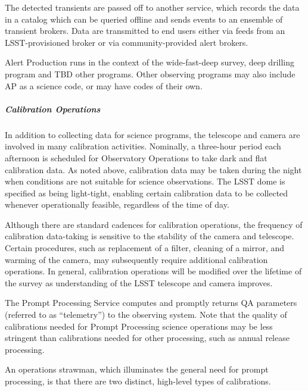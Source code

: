 The detected transients are passed off to another service, which
records the data in a catalog which can be queried offline and sends
events to an ensemble of transient brokers. Data are transmitted to end
users either via feeds from an LSST-provisioned broker or via
community-provided alert brokers.

Alert Production runs in the context of the wide-fast-deep survey,
deep drilling program and TBD other programs. Other observing programs
may also include AP as a science code, or may have codes of their own.

\subparagraph{Calibration Operations}

In addition to collecting data for science programs, the telescope and
camera are involved in many calibration activities. Nominally, a 
three-hour period each afternoon is scheduled for Observatory Operations 
to take dark and flat calibration data. As noted above, calibration data
may be taken during the night when conditions are not suitable for 
science observations. The LSST dome is specified as being light-tight, 
enabling certain calibration data to be collected whenever operationally 
feasible, regardless of the time of day.

Although there are standard cadences for calibration operations, the
frequency of calibration data-taking is sensitive to the stability of
the camera and telescope. Certain procedures, such as replacement of a
filter, cleaning of a mirror, and warming of the camera, may
subsequently require additional calibration operations. In general,
calibration operations will be modified over the lifetime of the
survey as understanding of the LSST telescope and camera improves.

The Prompt Processing Service computes and promptly returns QA
parameters (referred to as “telemetry”) to the observing system. Note
that the quality of calibrations needed for Prompt Processing science
operations may be less stringent than calibrations needed for other
processing, such as annual release processing.

An operations strawman, which illuminates the general need for prompt
processing, is that there are two distinct, high-level types of
calibrations.

